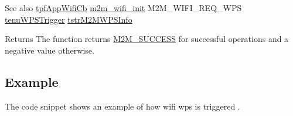 \begin{DoxySeeAlso}{See also}
\hyperlink{group__WlanEnums_gac5302f32839285fe8375c159087aa8a1}{tpf\+App\+Wifi\+Cb} \hyperlink{group__WifiInitFn_ga73c734812e844d96d860c4e93e9daf35}{m2m\+\_\+wifi\+\_\+init} M2\+M\+\_\+\+W\+I\+F\+I\+\_\+\+R\+E\+Q\+\_\+\+W\+PS \hyperlink{group__WlanEnums_ga5bbde63fb908694883507ec7295f74f6}{tenu\+W\+P\+S\+Trigger} \hyperlink{structtstrM2MWPSInfo}{tstr\+M2\+M\+W\+P\+S\+Info}
\end{DoxySeeAlso}
\begin{DoxyReturn}{Returns}
The function returns \hyperlink{nm__common_8h_a9ef27ba27aafdd1aa3a79d3ba2c36b8f}{M2\+M\+\_\+\+S\+U\+C\+C\+E\+SS} for successful operations and a negative value otherwise. 
\end{DoxyReturn}
\hypertarget{group__WifiEnableMonitorModeFn_Example}{}\subsection{Example}\label{group__WifiEnableMonitorModeFn_Example}
The code snippet shows an example of how wifi wps is triggered . 
